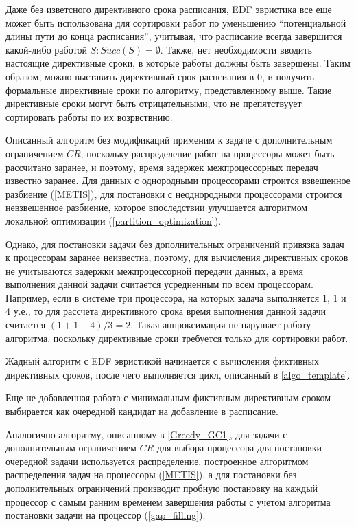 Даже без изветсного директивного срока расписания, EDF эвристика все еще может быть использована для сортировки работ по уменьшению ``потенциальной длины пути  до конца расписания'', учитывая, что расписание всегда завершится какой-либо работой $S : Succ(S) = \emptyset$. Также, нет необходимости вводить настоящие директивные сроки, в которые работы должны быть завершены. Таким образом, можно выставить директивный срок распсиания в $0$, и получить формальные директивные сроки по алгоритму, представленному выше. Такие директивные сроки могут быть отрицательными, что не препятствуует сортировать работы по их возрвствнию.

Описанный алгоритм без модификаций применим к задаче с дополнительным ограничением $CR$, поскольку распределение работ на процессоры может быть рассчитано заранее, и поэтому, время задержек межпроцессорных передач известно заранее. Для данных с однородными процессорами строится взвешенное разбиение (\ref{METIS}), для постановки с неоднородными процессорами строится невзвешенное разбиение, которое впоследствии улучшается алгоритмом локальной оптимизации (\ref{partition_optimization}). 

Однако, для постановки задачи без дополнительных ограничений привязка задач к процессорам заранее неизвестна, поэтому, для вычисления директивных сроков не учитываются задержки межпроцессорной передачи данных, а время выполнения данной задачи считается усредненным по всем процессорам. Например, если в системе три процессора, на которых задача выполняется 1, 1 и 4 у.е., то для рассчета директивного срока время выполнения данной задачи считается $(1+1+4)/3 = 2$. Такая аппроксимация не нарушает работу алгоритма, поскольку директивные сроки требуется только для сортировки работ.

Жадный алгоритм с EDF эвристикой начинается с вычисления фиктивных директивных сроков, после чего выполняется цикл, описанный в \ref{algo_template}.

Еще не добавленная работа с минимальным фиктивным директивным сроком выбирается как очередной кандидат на добавление в расписание. 

Аналогично алгоритму, описанному в \ref{Greedy_GC1}, для задачи с дополнительным ограничением $CR$ для выбора процессора для постановки очередной задачи используется распределение, построенное алгоритмом распределения задач на процессоры (\ref{METIS}), а для постановки без дополнительных ограничений производит пробную постановку на каждый процессор с самым ранним временем завершения работы с учетом алгоритма постановки задачи на процессор (\ref{gap_filling}).

